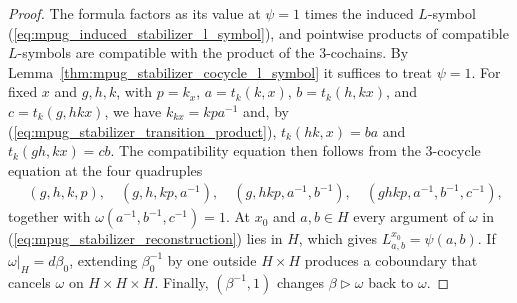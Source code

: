 \begin{proof}\leanok
    The formula factors as its value at $\psi=1$ times the induced
    $L$-symbol (\ref{eq:mpug_induced_stabilizer_l_symbol}), and pointwise
    products of compatible $L$-symbols are compatible with the product of
    the $3$-cochains. By Lemma~\ref{thm:mpug_stabilizer_cocycle_l_symbol}
    it suffices to treat $\psi=1$. For fixed $x$ and $g,h,k$, with $p=k_x$,
    $a=t_k(k,x)$, $b=t_k(h,kx)$, and $c=t_k(g,hkx)$, we have $k_{kx}=kpa^{-1}$
    and, by (\ref{eq:mpug_stabilizer_transition_product}),
    $t_k(hk,x)=ba$ and $t_k(gh,kx)=cb$. The compatibility equation then
    follows from the $3$-cocycle equation at the four quadruples
    \begin{align}
         & (g,h,k,p),\quad (g,h,kp,a^{-1}),\quad (g,hkp,a^{-1},b^{-1}),\quad
        (ghkp,a^{-1},b^{-1},c^{-1}),
    \end{align}
    together with $\omega(a^{-1},b^{-1},c^{-1})=1$. At $x_0$ and $a,b\in H$
    every argument of $\omega$ in (\ref{eq:mpug_stabilizer_reconstruction})
    lies in $H$, which gives $L^{x_0}_{a,b}=\psi(a,b)$. If
    $\omega|_H=d\beta_0$, extending $\beta_0^{-1}$ by one outside
    $H\times H$ produces a coboundary that cancels $\omega$ on
    $H\times H\times H$. Finally, $(\beta^{-1},1)$ changes
    $\beta\mathbin{\triangleright}\omega$ back to $\omega$.
\end{proof}

